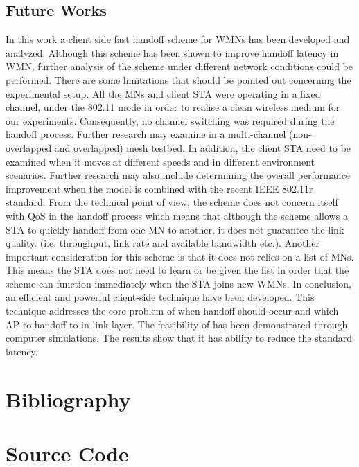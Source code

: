 \documentclass[12pt,a4paper]{report}
\begin{document}
\section{Future Works}
In this work a client side fast handoff scheme for WMNs has been developed and analyzed. Although this scheme has been shown to improve handoff latency in WMN, further analysis of the scheme under different network conditions could be performed. There are some limitations that should be pointed out concerning the experimental setup. All the MNs and client STA were operating in a fixed channel, under the 802.11 mode in order to realise a clean wireless medium for our experiments. Consequently, no channel switching was required during the handoff process. Further research may examine in a multi-channel (non-overlapped and overlapped) mesh testbed. In addition, the client STA need to be examined when it moves at different speeds and in different environment scenarios. Further research may also include determining the overall performance improvement when the model is combined with the recent IEEE 802.11r standard. From the technical point of view, the scheme does not concern itself with QoS in the handoff process which means that although the scheme allows a STA to quickly handoff from one MN to another, it does not guarantee the link quality. (i.e. throughput, link rate and available bandwidth etc.). Another important consideration for this scheme is that it does not relies on a list of MNs. This means the STA does not need to learn or be given the list in order that the scheme can function immediately when the STA joins new WMNs. 
In conclusion, an efficient and powerful client-side technique have been developed. This technique addresses the core problem of when handoff should occur and which AP to handoff to in link layer. The feasibility of has been demonstrated through computer simulations. The results show that it has ability to reduce the standard latency.

\chapter*{Bibliography}
\appendices
\chapter{Source Code}

\end{document}

